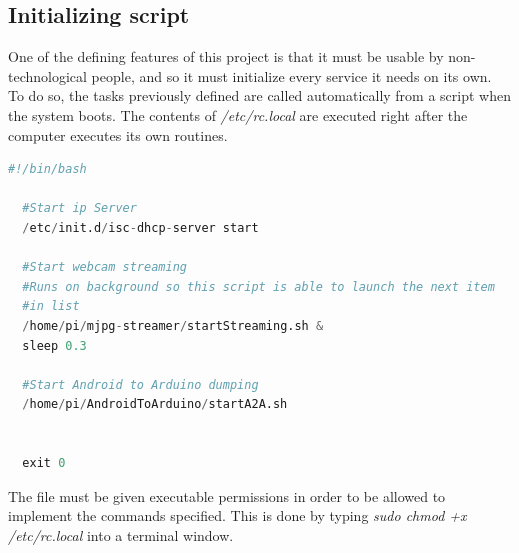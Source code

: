 












\subsection{Initializing script} 

One of the defining features of this project is that it must be usable by non-technological people, and so it must initialize every service it needs on its own. \\

To do so, the tasks previously defined are called automatically from a script when the system boots. The contents of \textit{/etc/rc.local} are executed right after the computer executes its own routines.\cite{component15}\\


	\begin{minipage}{\linewidth}%
	\begin{lstlisting}[label=rc.local,caption=Initialization Script {[} /etc/rc.local {]} ,language=python ]
  #!/bin/bash

  #Start ip Server
  /etc/init.d/isc-dhcp-server start

  #Start webcam streaming 
  #Runs on background so this script is able to launch the next item 
  #in list
  /home/pi/mjpg-streamer/startStreaming.sh &
  sleep 0.3

  #Start Android to Arduino dumping
  /home/pi/AndroidToArduino/startA2A.sh 


  exit 0


	\end{lstlisting}
	\end{minipage}

\bigskip
The file must be given executable permissions in order to be allowed to implement the commands specified. This is done by typing \textit{sudo chmod +x /etc/rc.local} into a terminal window.